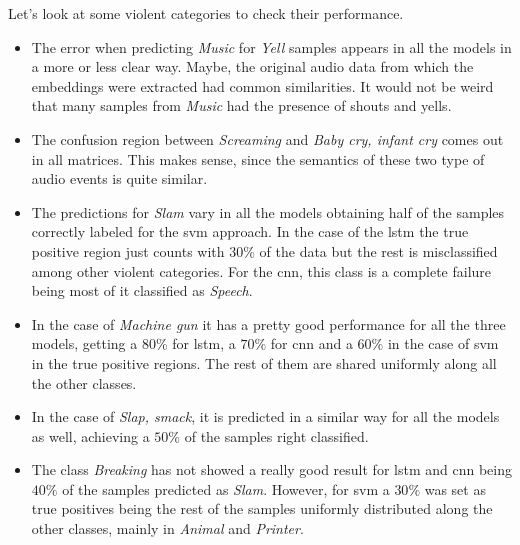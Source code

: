 	Let's look at some violent categories to check their performance. 
	
	\begin{itemize}
		\item The error when predicting \textit{Music} for \textit{Yell} samples appears in all the models in a more or less clear way. Maybe, the original audio data from which the embeddings were extracted had common similarities. It would not be weird that many samples from \textit{Music} had the presence of shouts and yells.
		\item The confusion region between \textit{Screaming} and \textit{Baby cry, infant cry} comes out in all matrices. This makes sense, since the semantics of these two type of audio events is quite similar.
		\item The predictions for \textit{Slam} vary in all the models obtaining half of the samples correctly labeled for the \acrshort{svm} approach. In the case of the \acrshort{lstm} the true positive region just counts with $30\%$ of the data but the rest is misclassified among other violent categories. For the \acrshort{cnn}, this class is a complete failure being most of it classified as \textit{Speech}.
		\item In the case of \textit{Machine gun} it has a pretty good performance for all the three models, getting a $80\%$ for \acrshort{lstm}, a $70\%$ for \acrshort{cnn} and a $60\%$ in the case of \acrshort{svm} in the true positive regions. The rest of them are shared uniformly along all the other classes.
		\item In the case of \textit{Slap, smack}, it is predicted in a similar way for all the models as well, achieving a $50\%$ of the samples right classified.
		\item The class \textit{Breaking} has not showed a really good result for \acrshort{lstm} and \acrshort{cnn} being $40\%$ of the samples predicted as \textit{Slam}. However, for \acrshort{svm} a $30\%$ was set as true positives being the rest of the samples uniformly distributed along the other classes, mainly in \textit{Animal} and \textit{Printer}.
	\end{itemize}
	
